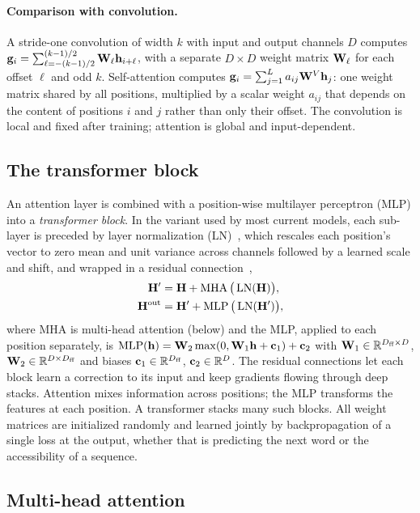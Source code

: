 \paragraph{Comparison with convolution.} A stride-one convolution of width $k$ with input and output channels $D$ computes $\mathbf{g}_i=\sum_{\ell=-(k-1)/2}^{(k-1)/2}\mathbf{W}_\ell\mathbf{h}_{i+\ell}$, with a separate $D\times D$ weight matrix $\mathbf{W}_\ell$ for each offset $\ell$ and odd $k$. Self-attention computes $\mathbf{g}_i=\sum_{j=1}^L a_{ij}\mathbf{W}^V\mathbf{h}_j$: one weight matrix shared by all positions, multiplied by a scalar weight $a_{ij}$ that depends on the content of positions $i$ and $j$ rather than only their offset. The convolution is local and fixed after training; attention is global and input-dependent.

\subsection{The transformer block}

An attention layer is combined with a position-wise multilayer perceptron (MLP) into a \emph{transformer block}. In the variant used by most current models, each sub-layer is preceded by layer normalization (LN)~\citep{ba2016}, which rescales each position's vector to zero mean and unit variance across channels followed by a learned scale and shift, and wrapped in a residual connection~\citep{he2016},
\begin{align}
  \mathbf{H}' &= \mathbf{H} + \operatorname{MHA}\big(\operatorname{LN}(\mathbf{H})\big), \\
  \mathbf{H}^{\text{out}} &= \mathbf{H}' + \operatorname{MLP}\big(\operatorname{LN}(\mathbf{H}')\big),
\end{align}
where MHA is multi-head attention (below) and the MLP, applied to each position separately, is $\operatorname{MLP}(\mathbf{h})=\mathbf{W}_2\max(0,\mathbf{W}_1\mathbf{h}+\mathbf{c}_1)+\mathbf{c}_2$ with $\mathbf{W}_1\in\mathbb{R}^{D_{\text{ff}}\times D}$, $\mathbf{W}_2\in\mathbb{R}^{D\times D_{\text{ff}}}$ and biases $\mathbf{c}_1\in\mathbb{R}^{D_{\text{ff}}}$, $\mathbf{c}_2\in\mathbb{R}^{D}$. The residual connections let each block learn a correction to its input and keep gradients flowing through deep stacks. Attention mixes information across positions; the MLP transforms the features at each position. A transformer stacks many such blocks. All weight matrices are initialized randomly and learned jointly by backpropagation of a single loss at the output, whether that is predicting the next word or the accessibility of a sequence.

\subsection{Multi-head attention}

